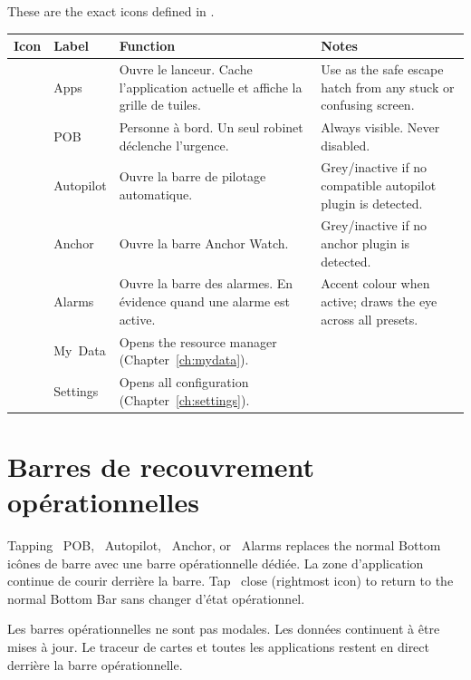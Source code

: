 These are the exact icons defined in .

\begin{longtable}{C{1.4cm}L{2.4cm}L{5.4cm}L{4.5cm}}
\toprule
{}
\color{white}\sffamily\bfseries Icon &
\color{white}\sffamily\bfseries Label &
\color{white}\sffamily\bfseries Function &
\color{white}\sffamily\bfseries Notes \\
\midrule
{}     & Apps      &
Ouvre le lanceur. Cache l'application actuelle et affiche la grille de tuiles.&
  Use as the safe escape hatch from any stuck or confusing screen. \\
        & POB       &
Personne à bord. Un seul robinet déclenche l'urgence.&
  Always visible. Never disabled. \\
& Autopilot &
Ouvre la barre de pilotage automatique.&
  Grey/inactive if no compatible autopilot plugin is detected. \\
       & Anchor    &
Ouvre la barre Anchor Watch.&
  Grey/inactive if no anchor plugin is detected. \\
    & Alarms    &
Ouvre la barre des alarmes. En évidence quand une alarme est active.&
  Accent colour when active; draws the eye across all presets. \\
         & My~Data   &
  Opens the resource manager (Chapter~\ref{ch:mydata}). & \\
     & Settings  &
  Opens all configuration (Chapter~\ref{ch:settings}). & \\
\bottomrule
\end{longtable}

\section{Barres de recouvrement opérationnelles}

Tapping ~POB, ~Autopilot,
~Anchor, or ~Alarms replaces the normal Bottom
icônes de barre avec une barre opérationnelle dédiée.
La zone d'application continue de courir derrière la barre.
Tap ~close (rightmost icon) to return to the normal Bottom Bar
sans changer d'état opérationnel.

\begin{warningbox}
Les barres opérationnelles ne sont pas modales.
Les données continuent à être mises à jour.
Le traceur de cartes et toutes les applications restent en direct derrière la barre opérationnelle.
\end{warningbox}

